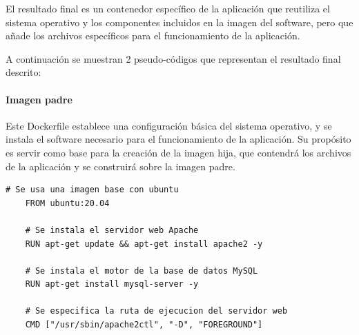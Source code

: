                 El resultado final es un contenedor específico de la aplicación que reutiliza el sistema operativo y los componentes incluidos en la imagen del software, pero que añade los archivos específicos para el funcionamiento de la aplicación.

                A continuación se muestran 2 pseudo-códigos que representan el resultado final descrito:

                \paragraph{Imagen padre} Este Dockerfile establece una configuración básica del sistema operativo, y se instala el software necesario para el funcionamiento de la aplicación. Su propósito es servir como base para la creación de la imagen hija, que contendrá los archivos de la aplicación y se construirá sobre la imagen padre.
                \\

                \begin{lstlisting}[style=dockerfile_style, caption={Dockerfile de una imagen principal (padre)}]
    # Se usa una imagen base con ubuntu
    FROM ubuntu:20.04
    
    # Se instala el servidor web Apache
    RUN apt-get update && apt-get install apache2 -y
    
    # Se instala el motor de la base de datos MySQL
    RUN apt-get install mysql-server -y
    
    # Se especifica la ruta de ejecucion del servidor web
    CMD ["/usr/sbin/apache2ctl", "-D", "FOREGROUND"]
                \end{lstlisting}

